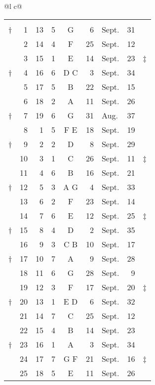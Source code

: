 \begin{tabular}{@{}l c@{}}
\toprule
 \\
\toprule

\begin{tabular}[t]{@{}r rrcc r@{~}l r l@{}}
\hdrs
\\
\cmidrule{2-8}
† &  1 & 13 &  5 &  G  &  6 &Sept. & 31 & ~ \\
~ &  2 & 14 &  4 &  F  & 25 & Sept. & 12 & ~ \\
~ &  3 & 15 &  1 &  E  & 14 & Sept. & 23 & ‡ \\
† &  4 & 16 &  6 & D C &  3 & Sept. & 34 & ~ \\
\cmidrule{2-8}
~ &  5 & 17 &  5 &  B  & 22 & Sept. & 15 \\
~ &  6 & 18 &  2 &  A  & 11 & Sept. & 26 \\
† &  7 & 19 &  6 &  G  & 31 & Aug.  & 37 \\
~ &  8 &  1 &  5 & F E & 18 & Sept. & 19 \\
\cmidrule{2-8}
† &  9 &  2 &  2 &  D  &  8 & Sept. & 29 & ~\\
~ & 10 &  3 &  1 &  C  & 26 & Sept. & 11 & ‡ \\
~ & 11 &  4 &  6 &  B  & 16 & Sept. & 21 \\
† & 12 &  5 &  3 & A G &  4 & Sept. & 33 \\
\cmidrule{2-8}
~ & 13 &  6 &  2 &  F  & 23 & Sept. & 14 \\
~ & 14 &  7 &  6 &  E  & 12 & Sept. & 25 & ‡ \\
† & 15 &  8 &  4 &  D  &  2 & Sept. & 35 \\
~ & 16 &  9 &  3 & C B & 10 & Sept. & 17 \\
\cmidrule{2-8}
† & 17 & 10 &  7 &  A  &  9 & Sept. & 28 \\
~ & 18 & 11 &  6 &  G  & 28 & Sept. &  9 & ~\\
~ & 19 & 12 &  3 &  F  & 17 & Sept. & 20 & ‡ \\
† & 20 & 13 &  1 & E D &  6 & Sept. & 32 \\
\cmidrule{2-8}
~ & 21 & 14 &  7 &  C  & 25 & Sept. & 12 \\
~ & 22 & 15 &  4 &  B  & 14 & Sept. & 23 \\
† & 23 & 16 &  1 &  A  &  3 & Sept. & 34 \\
~ & 24 & 17 &  7 & G F & 21 & Sept. & 16 & ‡ \\
\cmidrule{2-8}
~ & 25 & 18 &  5 &  E  & 11 & Sept. & 26 \\

\end{tabular}
\end{tabular}
